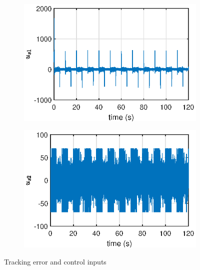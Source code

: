 \begin{figure}[H]
    \begin{minipage}{0.49\textwidth}
        \begin{figure}[H]
            \centering
            \includegraphics[width=\textwidth]{Part2/figs/4_figs/results/us1.eps}
        \end{figure}
    \end{minipage}
    \begin{minipage}{0.49\textwidth}
        \begin{figure}[H]
            \centering
            \includegraphics[width=\textwidth]{Part2/figs/4_figs/results/us2.eps}
        \end{figure}
    \end{minipage}
    \caption{Tracking error and control inputs}
    \label{fig::error_inputs}
\end{figure}


